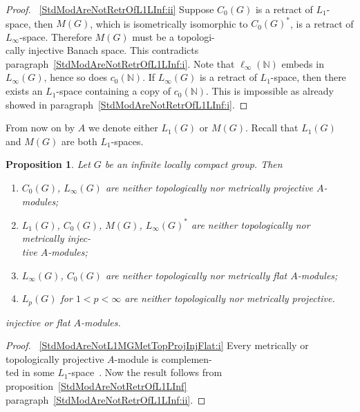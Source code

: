 \documentclass{article}
\theoremstyle{plain}
\newtheorem{proposition}{Proposition}[section]
\theoremstyle{definition}
\newtheorem{proof}{Proof}\def\theproof{}
\begin{document}
\begin{fulltext}
\begin{proof}
~\ref{StdModAreNotRetrOfL1LInf:ii} Suppose $C_0(G)$ is a retract of
$L_1$-space, then $M(G)$, which is isometrically isomorphic to ${C_0(G)}^*$, is a
retract of $L_\infty$-space. Therefore $M(G)$ must be a topologi-\\cally
injective Banach space. This contradicts
paragraph~\ref{StdModAreNotRetrOfL1LInf:i}. Note that $\ell_\infty(\mathbb{N})$
embeds in $L_\infty(G)$, hence so does $c_0(\mathbb{N})$. If $L_\infty(G)$ is a
retract of $L_1$-space, then there exists an $L_1$-space containing a copy of
$c_0(\mathbb{N})$. This is impossible as already showed in
paragraph~\ref{StdModAreNotRetrOfL1LInf:i}.
\end{proof}

From now on by $A$ we denote either $L_1(G)$ or $M(G)$. Recall that $L_1(G)$ and
$M(G)$ are both $L_1$-spaces.

\begin{proposition}\label{StdModAreNotL1MGMetTopProjInjFlat} Let $G$ be an
infinite locally compact group. Then
\begin{enumerate}[label = (\roman*)]
    \item $C_0(G)$, $L_\infty(G)$ are neither topologically nor metrically
    projective $A$-modules;\label{StdModAreNotL1MGMetTopProjInjFlat:i}
    
    \item $L_1(G)$, $C_0(G)$, $M(G)$, ${L_\infty(G)}^*$ are neither topologically
    nor metrically injec-\\tive 
    $A$-modules;\label{StdModAreNotL1MGMetTopProjInjFlat:ii}
    
    \item $L_\infty(G)$, $C_0(G)$ are neither topologically nor metrically flat
    $A$-modules;\label{StdModAreNotL1MGMetTopProjInjFlat:iii}
    
    \item $L_p(G)$ for $1<p<\infty$ are neither topologically nor metrically
    projective.\label{StdModAreNotL1MGMetTopProjInjFlat:iv}
\end{enumerate}
injective or flat $A$-modules.
\end{proposition}
\begin{proof}~\ref{StdModAreNotL1MGMetTopProjInjFlat:i} Every metrically or
topologically projective $A$-module is complemen-\\ted in some
$L_1$-space~\cite[proposition 3.8]{NemGeomProjInjFlatBanMod}. Now the result
follows from proposition~\ref{StdModAreNotRetrOfL1LInf}
paragraph~\ref{StdModAreNotRetrOfL1LInf:ii}.


\end{proof}
\end{fulltext}
\end{document}
